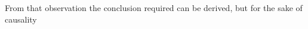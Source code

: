 \documentclass[preview]{standalone}
\begin{document}
\begin{center}
From that observation the conclusion required can be derived, but for the sake of causality
\end{center}
\end{document}
